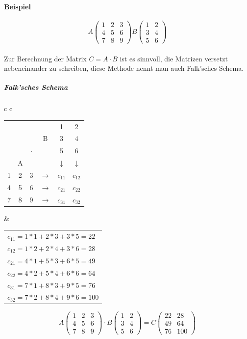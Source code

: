 \documentclass{school}
\begin{document}
\paragraph{Beispiel}
$$A\begin{pmatrix}
    1 & 2 & 3\\
    4 & 5 & 6\\
    7 & 8 & 9
\end{pmatrix}
B\begin{pmatrix}
    1 & 2\\
    3 & 4\\
    5 & 6
\end{pmatrix}
$$
~\\
Zur Berechnung der Matrix  $C = A \cdot B$ ist es sinnvoll, die Matrizen versetzt nebeneinander zu schreiben, diese Methode nennt man auch Falk'sches Schema.
\subparagraph{Falk'sches Schema}
\begin{center}
    \begin{tabular}{c c}
        \begin{tabular}{c c c c | c | c |}
            & & & & 1 & 2\\
            & & & B & 3 & 4\\
            & & $\cdot$ & & 5 & 6\\
            & A & & & $\downarrow$ & $\downarrow$ \\\hline
            1 & 2 & 3 & $\to$ & $c_{11}$ & $c_{12}$\\\hline
            4 & 5 & 6 & $\to$ & $c_{21}$ & $c_{22}$\\\hline
            7 & 8 & 9 & $\to$ & $c_{31}$ & $c_{32}$
        \end{tabular}
        &
        \begin{tabular}{l   }
            $c_{11} = 1 * 1 + 2 * 3 + 3 * 5 = 22$\\
            $c_{12} = 1 * 2 + 2 * 4 + 3 * 6 = 28$\\
            $c_{21} = 4 * 1 + 5 * 3 + 6 * 5 = 49$\\
            $c_{22} = 4 * 2 + 5 * 4 + 6 * 6 = 64$\\
            $c_{31} = 7 * 1 + 8 * 3 + 9 * 5 = 76$\\
            $c_{32} = 7 * 2 + 8 * 4 + 9 * 6 = 100$
        \end{tabular}
    \end{tabular}
\end{center}
$$A \begin{pmatrix}
    1 & 2 & 3\\
    4 & 5 & 6\\
    7 & 8 & 9
\end{pmatrix} \cdot
B \begin{pmatrix}
    1 & 2\\
    3 & 4\\
    5 & 6
\end{pmatrix} =
C \begin{pmatrix}
    22 & 28\\
    49 & 64\\
    76 & 100
\end{pmatrix}
$$
\end{document}
